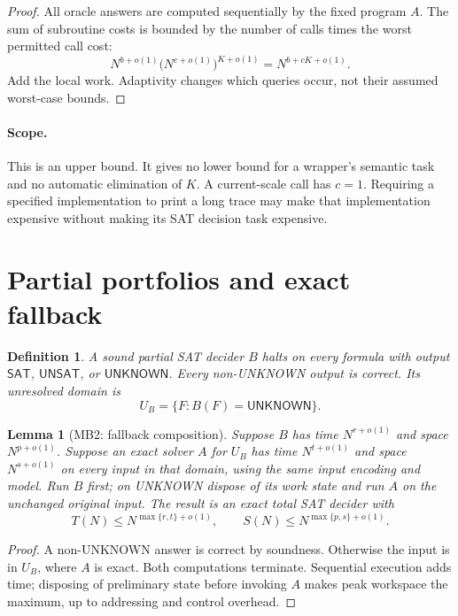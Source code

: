 \documentclass[11pt]{article}
\newtheorem{definition}{Definition}
\newtheorem{lemma}{Lemma}
\begin{document}
\begin{proof}
All oracle answers are computed sequentially by the fixed program $A$.
The sum of subroutine costs is bounded by the number of calls times the
worst permitted call cost:
\[
N^{b+o(1)}
 \bigl(N^{c+o(1)}\bigr)^{K+o(1)}
 =N^{b+cK+o(1)}.
\]
Add the local work. Adaptivity changes which queries occur, not their
assumed worst-case bounds.
\end{proof}

\paragraph{Scope.}
This is an upper bound. It gives no lower bound for a wrapper's semantic
task and no automatic elimination of $K$. A current-scale call has $c=1$.
Requiring a specified implementation to print a long trace may make that
implementation expensive without making its SAT decision task expensive.

\section{Partial portfolios and exact fallback}

\begin{definition}
A sound partial SAT decider $B$ halts on every formula with output
$\mathsf{SAT}$, $\mathsf{UNSAT}$, or $\mathsf{UNKNOWN}$.
Every non-UNKNOWN output is correct.
Its unresolved domain is
\[
U_B=\{F:B(F)=\mathsf{UNKNOWN}\}.
\]
\end{definition}

\begin{lemma}[MB2: fallback composition]
Suppose $B$ has time $N^{r+o(1)}$ and space $N^{p+o(1)}$.
Suppose an exact solver $A$ for $U_B$ has time $N^{t+o(1)}$ and
space $N^{s+o(1)}$ on every input in that domain, using the same input
encoding and model. Run $B$ first; on UNKNOWN dispose of its work state
and run $A$ on the unchanged original input.
The result is an exact total SAT decider with
\[
T(N)\le N^{\max\{r,t\}+o(1)},\qquad
S(N)\le N^{\max\{p,s\}+o(1)}.
\]
\end{lemma}

\begin{proof}
A non-UNKNOWN answer is correct by soundness. Otherwise the input is
in $U_B$, where $A$ is exact. Both computations terminate. Sequential
execution adds time; disposing of preliminary state before invoking $A$
makes peak workspace the maximum, up to addressing and control overhead.
\end{proof}
\end{document}
